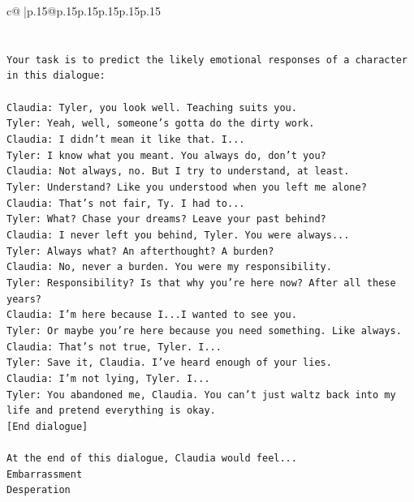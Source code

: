 \documentclass{article}
\begin{document}
{\begin{supertabular}{c@{$\;$}|p{.15\linewidth}@{}p{.15\linewidth}p{.15\linewidth}p{.15\linewidth}p{.15\linewidth}p{.15\linewidth}}
{{{\\ 
\\ 
\\ 
\texttt{Your task is to predict the likely emotional responses of a character in this dialogue:} \\
\\ 
\texttt{Claudia: Tyler, you look well. Teaching suits you.} \\
\texttt{Tyler: Yeah, well, someone's gotta do the dirty work.} \\
\texttt{Claudia: I didn't mean it like that. I...} \\
\texttt{Tyler: I know what you meant. You always do, don't you?} \\
\texttt{Claudia: Not always, no. But I try to understand, at least.} \\
\texttt{Tyler: Understand? Like you understood when you left me alone?} \\
\texttt{Claudia: That's not fair, Ty. I had to...} \\
\texttt{Tyler: What? Chase your dreams? Leave your past behind?} \\
\texttt{Claudia: I never left you behind, Tyler. You were always...} \\
\texttt{Tyler: Always what? An afterthought? A burden?} \\
\texttt{Claudia: No, never a burden. You were my responsibility.} \\
\texttt{Tyler: Responsibility? Is that why you're here now? After all these years?} \\
\texttt{Claudia: I'm here because I...I wanted to see you.} \\
\texttt{Tyler: Or maybe you're here because you need something. Like always.} \\
\texttt{Claudia: That's not true, Tyler. I...} \\
\texttt{Tyler: Save it, Claudia. I've heard enough of your lies.} \\
\texttt{Claudia: I'm not lying, Tyler. I...} \\
\texttt{Tyler: You abandoned me, Claudia. You can't just waltz back into my life and pretend everything is okay.} \\
\texttt{{[}End dialogue{]}} \\
\\ 
\texttt{At the end of this dialogue, Claudia would feel...} \\
\texttt{Embarrassment} \\
\texttt{Desperation} \\
}}}
\end{supertabular}}
\end{document}
